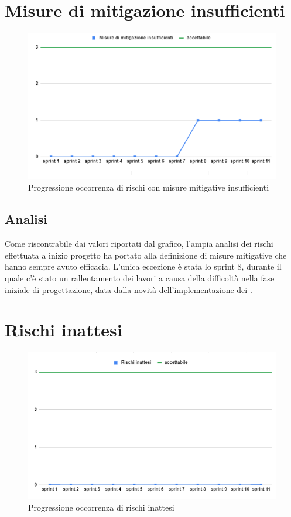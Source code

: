 \section{Misure di mitigazione insufficienti}
\begin{figure}[H]
    \centering
    \includegraphics[width=0.8\linewidth]{Mitigazioni.png}
    \caption{Progressione occorrenza di rischi con misure mitigative insufficienti}
\end{figure}
\subsection{Analisi}
Come riscontrabile dai valori riportati dal grafico, l'ampia analisi dei rischi effettuata a inizio progetto ha portato alla definizione di misure mitigative che hanno sempre avuto efficacia. L'unica eccezione è stata lo sprint 8, durante il quale c'è stato un rallentamento dei lavori a causa della difficoltà nella fase iniziale di progettazione, data dalla novità dell'implementazione dei .

\section{Rischi inattesi}
\begin{figure}[H]
    \centering
    \includegraphics[width=0.8\linewidth]{Rischi.png}
    \caption{Progressione occorrenza di rischi inattesi}
\end{figure}
